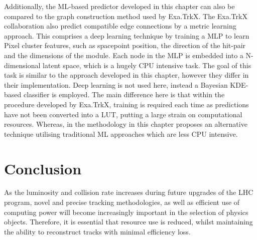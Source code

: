 Additionally, the ML-based predictor developed in this chapter can also be compared to the graph construction method used by Exa.TrkX. The Exa.TrkX collaboration also predict compatible edge connections by a metric learning approach. This comprises a deep learning technique by training a MLP to learn Pixel cluster features, such as spacepoint position, the direction of the hit-pair and the dimensions of the module. Each node in the MLP is embedded into a N-dimensional latent space, which is a hugely CPU intensive task. The goal of this task is similar to the approach developed in this chapter, however they differ in their implementation. Deep learning is not used here, instead a Bayesian KDE-based classifier is employed. The main difference here is that within the procedure developed by Exa.TrkX, training is required each time as predictions have not been converted into a LUT, putting a large strain on computational resources. Whereas, in the methodology in this chapter proposes an alternative technique utilising traditional ML approaches which are less CPU intensive.


\section{Conclusion}

As the luminosity and collision rate increases during future upgrades of the LHC program, novel and precise tracking methodologies, as well as efficient use of computing power will become increasingly important in the selection of physics objects. Therefore, it is essential that resource use is reduced, whilst maintaining the ability to reconstruct tracks with minimal efficiency loss. 

